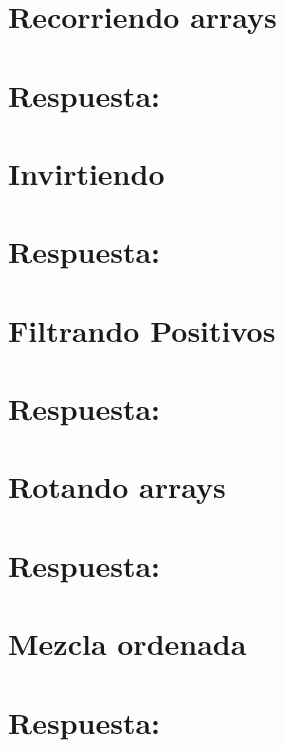 \section{Recorriendo arrays}


\ifshowanswers
\section*{Respuesta:}

\fi

\section{Invirtiendo}


\ifshowanswers
\section*{Respuesta:}

\fi

\section{Filtrando Positivos}


\ifshowanswers
\section*{Respuesta:}

\fi

\section{Rotando arrays}


\ifshowanswers
\section*{Respuesta:}

\fi

\section{Mezcla ordenada}


\ifshowanswers
\section*{Respuesta:}

\fi

